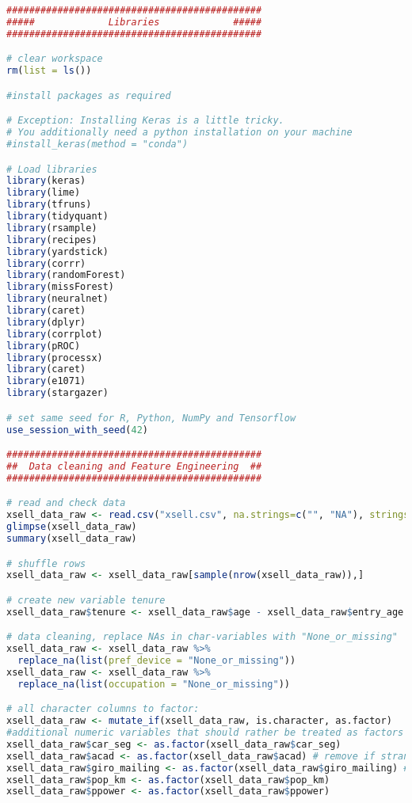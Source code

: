 \begin{lstlisting}[language=R,caption={Main analysis}, label=lst_main]
#############################################
#####             Libraries             #####
#############################################

# clear workspace
rm(list = ls())

#install packages as required

# Exception: Installing Keras is a little tricky. 
# You additionally need a python installation on your machine
#install_keras(method = "conda")

# Load libraries
library(keras)
library(lime)
library(tfruns)
library(tidyquant)
library(rsample)
library(recipes)
library(yardstick)
library(corrr)
library(randomForest)
library(missForest)
library(neuralnet)
library(caret)
library(dplyr)
library(corrplot)
library(pROC)
library(processx)
library(caret)
library(e1071)
library(stargazer)

# set same seed for R, Python, NumPy and Tensorflow
use_session_with_seed(42) 

#############################################
##  Data cleaning and Feature Engineering  ##
#############################################

# read and check data
xsell_data_raw <- read.csv("xsell.csv", na.strings=c("", "NA"), stringsAsFactors = FALSE)
glimpse(xsell_data_raw)
summary(xsell_data_raw)

# shuffle rows
xsell_data_raw <- xsell_data_raw[sample(nrow(xsell_data_raw)),]

# create new variable tenure
xsell_data_raw$tenure <- xsell_data_raw$age - xsell_data_raw$entry_age

# data cleaning, replace NAs in char-variables with "None_or_missing"
xsell_data_raw <- xsell_data_raw %>%
  replace_na(list(pref_device = "None_or_missing"))
xsell_data_raw <- xsell_data_raw %>%
  replace_na(list(occupation = "None_or_missing"))

# all character columns to factor:
xsell_data_raw <- mutate_if(xsell_data_raw, is.character, as.factor)
#additional numeric variables that should rather be treated as factors
xsell_data_raw$car_seg <- as.factor(xsell_data_raw$car_seg)
xsell_data_raw$acad <- as.factor(xsell_data_raw$acad) # remove if strange results
xsell_data_raw$giro_mailing <- as.factor(xsell_data_raw$giro_mailing) # remove if strange results
xsell_data_raw$pop_km <- as.factor(xsell_data_raw$pop_km)
xsell_data_raw$ppower <- as.factor(xsell_data_raw$ppower)


\end{lstlisting}
